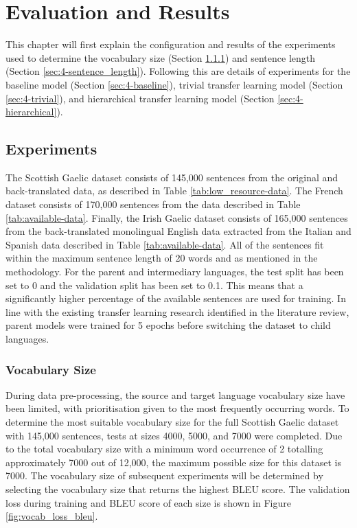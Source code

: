 \chapter{Evaluation and Results}
This chapter will first explain the configuration and results of the experiments used to determine the vocabulary size (Section \ref{sec:4-vocab_size}) and sentence length (Section \ref{sec:4-sentence_length}). Following this are details of experiments for the baseline model (Section \ref{sec:4-baseline}), trivial transfer learning model (Section \ref{sec:4-trivial}), and hierarchical transfer learning model (Section \ref{sec:4-hierarchical}).
\newpage

\section{Experiments}

The Scottish Gaelic dataset consists of 145,000 sentences from the original and back-translated data, as described in Table \ref{tab:low_resource-data}. The French dataset consists of 170,000 sentences from the data described in Table \ref{tab:available-data}. Finally, the Irish Gaelic dataset consists of 165,000 sentences from the back-translated monolingual English data extracted from the Italian and Spanish data described in Table \ref{tab:available-data}.
All of the sentences fit within the maximum sentence length of 20 words and as mentioned in the methodology.
For the parent and intermediary languages, the test split has been set to 0 and the validation split has been set to 0.1. This means that a significantly higher percentage of the available sentences are used for training. In line with the existing transfer learning research identified in the literature review, parent models were trained for 5 epochs before switching the dataset to child languages.


\subsection{Vocabulary Size}
\label{sec:4-vocab_size}

During data pre-processing, the source and target language vocabulary size have been limited, with prioritisation given to the most frequently occurring words. To determine the most suitable vocabulary size for the full Scottish Gaelic dataset with 145,000 sentences, tests at sizes 4000, 5000, and 7000 were completed. Due to the total vocabulary size with a minimum word occurrence of 2 totalling approximately 7000 out of 12,000, the maximum possible size for this dataset is 7000. 
The vocabulary size of subsequent experiments will be determined by selecting the vocabulary size that returns the highest \acrshort{BLEU} score. The validation loss during training and \acrshort{BLEU} score of each size is shown in Figure \ref{fig:vocab_loss_bleu}.

